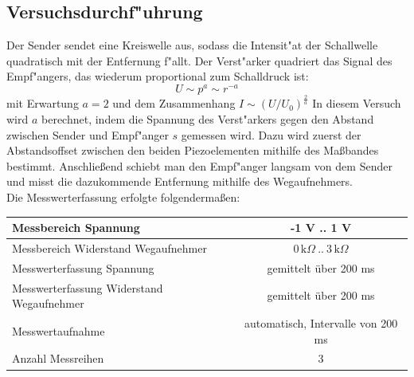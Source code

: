 \documentclass[12pt,a4paper]{article}
\begin{document}
\subsection{Versuchsdurchf"uhrung}
Der Sender sendet eine Kreiswelle aus, sodass die Intensit"at der Schallwelle quadratisch mit der Entfernung f"allt. Der Verst"arker quadriert das Signal des Empf"angers, das wiederum proportional zum Schalldruck ist:
\begin{equation}
U\sim p^a \sim r^{-a}
\end{equation}
mit Erwartung $a=2$ und dem Zusammenhang $I\sim (U/U_0)^{\frac{2}{a}}$
In diesem Versuch wird $a$ berechnet, indem die Spannung des Verst"arkers gegen den Abstand zwischen Sender und Empf"anger $s$ gemessen wird. Dazu wird zuerst der Abstandsoffset zwischen den beiden Piezoelementen mithilfe des Ma\ss bandes bestimmt. Anschlie\ss end schiebt man den Empf"anger langsam von dem Sender und misst die dazukommende Entfernung mithilfe des Wegaufnehmers.\\
Die Messwerterfassung erfolgte folgenderma\ss en:
\begin{table}[H]
	\centering
	\begin{tabular}{|l|c|}
		\hline 
		Messbereich Spannung  & -1 V .. 1 V \\ 
		\hline 
		Messbereich Widerstand Wegaufnehmer & $0\,\text{k}\Omega\ ..\ 3\,\text{k}\Omega$\\ 
		\hline 
		Messwerterfassung Spannung & gemittelt über 200 ms \\ 
		\hline
		Messwerterfassung Widerstand Wegaufnehmer & gemittelt über 200 ms \\ 
		\hline 
		Messwertaufnahme & automatisch, Intervalle von 200 ms \\ 
		\hline 
		Anzahl Messreihen & 3 \\ 
		\hline 
	\end{tabular} 
	\label{tab:MessparameterAllgemein}
\end{table}
\end{document}
